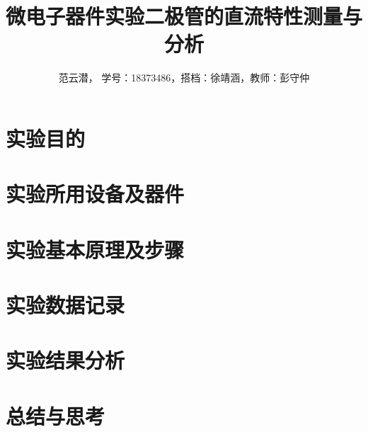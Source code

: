 \documentclass[lang=cn,11pt,a4paper,cite=authoryear]{elegantpaper}
\title{微电子器件实验\quad 二极管的直流特性测量与分析}
\author{范云潜， 学号：18373486，搭档：徐靖涵，教师：彭守仲}
\institute{微电子学院 184111 班}
\date{\zhdate{2020/10/19}}
\begin{document}
\maketitle



\section{实验目的}

\section{实验所用设备及器件}

\section{实验基本原理及步骤}

\section{实验数据记录}

\section{实验结果分析}

\section{总结与思考}


\end{document}
